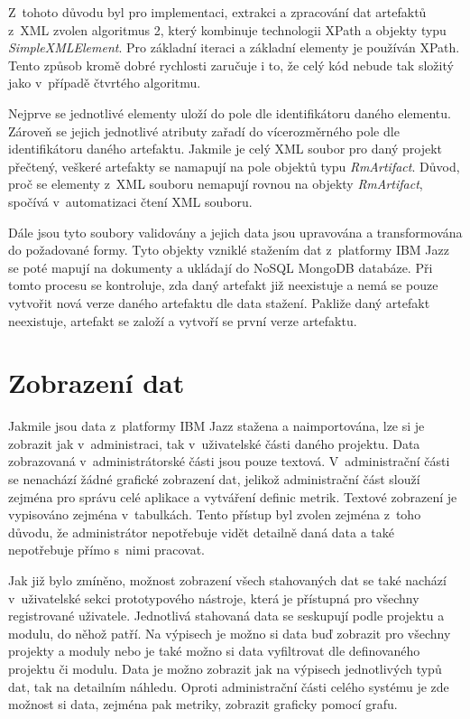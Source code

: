 \documentclass[czech,master]{diploma}
\begin{document}
Z~tohoto důvodu byl pro implementaci, extrakci a zpracování dat artefaktů z~XML zvolen algoritmus 2, který kombinuje technologii XPath a objekty typu \textit{SimpleXMLElement}. Pro základní iteraci a základní elementy je používán XPath. Tento způsob kromě dobré rychlosti zaručuje i to, že celý kód nebude tak složitý jako v~případě čtvrtého algoritmu.

Nejprve se jednotlivé elementy uloží do pole dle identifikátoru daného elementu. Zároveň se jejich jednotlivé atributy zařadí do vícerozměrného pole dle identifikátoru daného artefaktu. Jakmile je celý XML soubor pro daný projekt přečtený, veškeré artefakty se namapují na pole objektů typu \textit{RmArtifact}. Důvod, proč se elementy z~XML souboru nemapují rovnou na objekty \textit{RmArtifact}, spočívá v~automatizaci čtení XML souboru.

Dále jsou tyto soubory validovány a jejich data jsou upravována a transformována do požadované formy. Tyto objekty vzniklé stažením dat z~platformy IBM Jazz se poté mapují na dokumenty a ukládají do NoSQL MongoDB databáze. Při tomto procesu se kontroluje, zda daný artefakt již neexistuje a nemá se pouze vytvořit nová verze daného artefaktu dle data stažení. Pakliže daný artefakt neexistuje, artefakt se založí a vytvoří se první verze artefaktu.

\section{Zobrazení dat}
Jakmile jsou data z~platformy IBM Jazz stažena a naimportována, lze  si je zobrazit jak v~administraci, tak v~uživatelské části daného projektu. Data zobrazovaná v~administrátorské části jsou pouze textová. V~administrační části se nenachází žádné grafické zobrazení dat, jelikož administrační část slouží zejména pro správu celé aplikace a vytváření definic metrik. Textové zobrazení je vypisováno zejména v~tabulkách. Tento přístup byl zvolen zejména z~toho důvodu, že administrátor nepotřebuje vidět detailně daná data a také nepotřebuje přímo s~nimi pracovat.

Jak již bylo zmíněno, možnost zobrazení všech stahovaných dat se také nachází v~uživatelské sekci prototypového nástroje, která je přístupná pro všechny registrované uživatele. Jednotlivá stahovaná data se seskupují podle projektu a modulu, do něhož patří. Na výpisech je možno si data buď zobrazit pro všechny projekty a moduly nebo je také možno si data vyfiltrovat dle definovaného projektu či modulu. Data je možno zobrazit jak na výpisech jednotlivých typů dat, tak na detailním náhledu. Oproti administrační části celého systému je zde možnost si data, zejména pak metriky, zobrazit graficky pomocí grafu.
\end{document}

